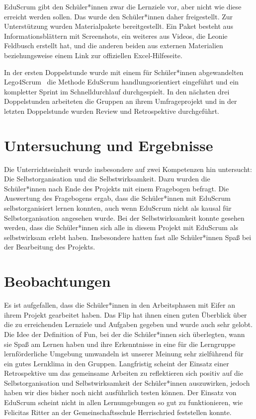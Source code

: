 \documentclass[twoside,twocolumn]{article}
\begin{document}
EduScrum gibt den Schüler*innen zwar die Lernziele vor, aber nicht wie diese erreicht werden sollen. Das wurde den Schüler*innen daher freigestellt. Zur Unterstützung wurden Materialpakete bereitgestellt. Ein Paket besteht aus Informationsblättern mit Screenshots, ein weiteres aus Videos, die Leonie Feldbusch erstellt hat, und die anderen beiden aus externen Materialien beziehungsweise einem Link zur offiziellen Excel-Hilfeseite.

In der ersten Doppelstunde wurde mit einem für Schüler*innen abgewandelten Lego4Scrum~\cite{lego} die Methode EduScrum handlungsorientiert eingeführt und ein kompletter Sprint im Schnelldurchlauf durchgespielt. In den nächsten drei Doppelstunden arbeiteten die Gruppen an ihrem Umfrageprojekt und in der letzten Doppelstunde wurden Review und Retrospektive durchgeführt. 


\section{Untersuchung und Ergebnisse}

Die Unterrichtseinheit wurde insbesondere auf zwei Kompetenzen hin untersucht: Die Selbstorganisation und die Selbstwirksamkeit. Dazu wurden die Schüler*innen nach Ende des Projekts mit einem Fragebogen befragt. Die Auswertung des Fragebogens ergab, dass die Schüler*innen mit EduScrum selbstorganisiert lernen konnten, auch wenn EduScrum nicht als kausal für Selbstorganisation angesehen wurde. Bei der Selbstwirksamkeit konnte gesehen werden, dass die Schüler*innen sich alle in diesem Projekt mit EduScrum als selbstwirksam erlebt haben. Insbesondere hatten fast alle Schüler*innen Spaß bei der Bearbeitung des Projekts.

\section{Beobachtungen}

Es ist aufgefallen, dass die Schüler*innen in den Arbeitsphasen mit Eifer an ihrem Projekt gearbeitet haben. Das Flip hat ihnen einen guten Überblick über die zu erreichenden Lernziele und Aufgaben gegeben und wurde auch sehr gelobt. Die Idee der Definition of Fun, bei der die Schüler*innen sich überlegten, wann sie Spaß am Lernen haben und ihre Erkenntnisse in eine für die Lerngruppe lernförderliche Umgebung umwandeln ist unserer Meinung sehr zielführend für ein gutes Lernklima in den Gruppen. Langfristig scheint der Einsatz einer Retrospektive um das gemeinsame Arbeiten zu reflektieren sich positiv auf die Selbstorganisation und Selbstwirksamkeit der Schüler*innen auszuwirken, jedoch haben wir dies bisher noch nicht ausführlich testen können. Der Einsatz von EduScrum scheint nicht in allen Lernumgebungen so gut zu funktionieren, wie Felicitas Ritter an der Gemeinschaftsschule Herrischried feststellen konnte.
\end{document}
